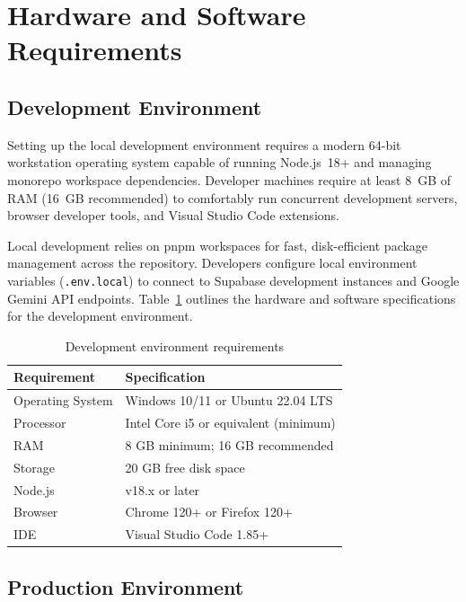 \section{Hardware and Software Requirements}
\label{sec:hw-sw}

\subsection{Development Environment}

Setting up the local development environment requires a modern 64-bit workstation operating system capable of running Node.js~18+ and managing monorepo workspace dependencies. Developer machines require at least 8~GB of RAM (16~GB recommended) to comfortably run concurrent development servers, browser developer tools, and Visual Studio Code extensions.

Local development relies on pnpm workspaces for fast, disk-efficient package management across the repository. Developers configure local environment variables (\texttt{.env.local}) to connect to Supabase development instances and Google Gemini API endpoints. Table~\ref{tab:dev-env} outlines the hardware and software specifications for the development environment.

\begin{table}[htbp]
\centering
\caption{Development environment requirements}
\label{tab:dev-env}
\small
\begin{tabular}{p{2in}p{3.5in}}
\toprule
\textbf{Requirement} & \textbf{Specification} \\
\midrule
Operating System     & Windows 10/11 or Ubuntu 22.04 LTS \\
Processor            & Intel Core i5 or equivalent (minimum) \\
RAM                  & 8 GB minimum; 16 GB recommended \\
Storage              & 20 GB free disk space \\
Node.js              & v18.x or later \\
Browser              & Chrome 120+ or Firefox 120+ \\
IDE                  & Visual Studio Code 1.85+ \\
\bottomrule
\end{tabular}
\end{table}

\subsection{Production Environment}

